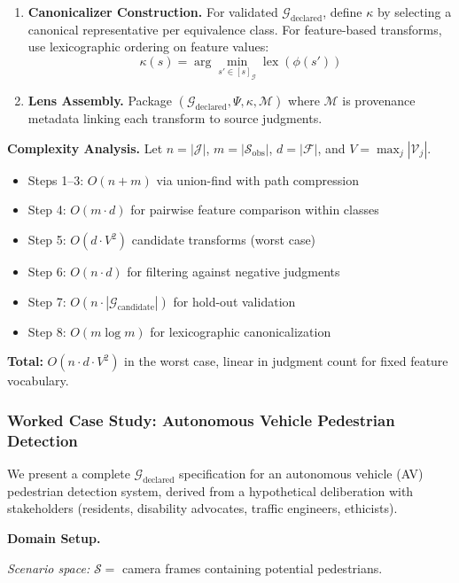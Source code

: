 \documentclass[12pt]{article}
\begin{document}
\begin{enumerate}
\item \textbf{Canonicalizer Construction.} For validated $\mathcal{G}_{\text{declared}}$, define $\kappa$ by selecting a canonical
representative per equivalence class. For feature-based transforms, use lexicographic ordering
on feature values:
\[
\kappa(s) = \arg\min_{s' \in [s]_\mathcal{G}} \operatorname{lex}(\phi(s'))
\]

\item \textbf{Lens Assembly.} Package $(\mathcal{G}_{\text{declared}}, \Psi, \kappa, \mathcal{M})$ where $\mathcal{M}$ is provenance metadata linking each
transform to source judgments.
\end{enumerate}

\textbf{Complexity Analysis.} Let $n = |\mathcal{J}|$, $m = |\mathcal{S}_{\text{obs}}|$, $d = |\mathcal{F}|$, and $V = \max_j |\mathcal{V}_j|$.

\begin{itemize}
\item Steps 1--3: $O(n + m)$ via union-find with path compression
\item Step 4: $O(m \cdot d)$ for pairwise feature comparison within classes
\item Step 5: $O(d \cdot V^2)$ candidate transforms (worst case)
\item Step 6: $O(n \cdot d)$ for filtering against negative judgments
\item Step 7: $O(n \cdot |\mathcal{G}_{\text{candidate}}|)$ for hold-out validation
\item Step 8: $O(m \log m)$ for lexicographic canonicalization
\end{itemize}

\textbf{Total:} $O(n \cdot d \cdot V^2)$ in the worst case, linear in judgment count for fixed feature vocabulary.

\subsubsection{Worked Case Study: Autonomous Vehicle Pedestrian Detection}

We present a complete $\mathcal{G}_{\text{declared}}$ specification for an autonomous vehicle (AV) pedestrian detection
system, derived from a hypothetical deliberation with stakeholders (residents, disability advocates,
traffic engineers, ethicists).

\textbf{Domain Setup.}

\emph{Scenario space:} $\mathcal{S} =$ camera frames containing potential pedestrians.
\end{document}
